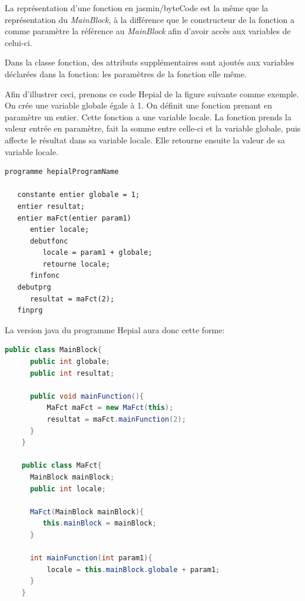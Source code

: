 \documentclass[11pt,a4paper]{article}
\begin{document}
  \par La représentation d'une fonction en jasmin/byteCode est la même que la représentation du \textit{MainBlock}, à la différence que le constructeur de la fonction a comme paramètre la référence au \textit{MainBlock} afin d'avoir accès aux variables de celui-ci. 
  
  \par Dans la classe fonction, des attributs supplémentaires sont ajoutés aux variables déclarées dans la fonction: les paramètres de la fonction elle même. 
  
  \par Afin d'illustrer ceci, prenons ce code Hepial de la figure suivante comme exemple. On crée une variable globale égale à 1. On définit une fonction prenant en paramètre un entier. Cette fonction a une variable locale. La fonction prends la valeur entrée en paramètre, fait la somme entre celle-ci et la variable globale, puis affecte le résultat dans sa variable locale. Elle retourne ensuite la valeur de sa variable locale. 
  \newpage
    \begin{lstlisting}[caption={Architecture d'une fonction et de son appel}]
   programme hepialProgramName

   constante entier globale = 1;
   entier resultat;
   entier maFct(entier param1)
      entier locale;
      debutfonc
         locale = param1 + globale;
         retourne locale;
      finfonc
   debutprg
      resultat = maFct(2);
   finprg
   \end{lstlisting} 
   
   \par La version java du programme Hepial aura donc cette forme: 
   
    \begin{lstlisting}[language=java,caption={Architecture de base d'un programme Hepial}]
    public class MainBlock{
      public int globale;
      public int resultat;
   
      public void mainFunction(){
          MaFct maFct = new MaFct(this);
          resultat = maFct.mainFunction(2);
      }
    }
    
    public class MaFct{
      MainBlock mainBlock;
      public int locale;
      
      MaFct(MainBlock mainBlock){
         this.mainBlock = mainBlock;
      }
      
      int mainFunction(int param1){
          locale = this.mainBlock.globale + param1;
      }
    }
   \end{lstlisting}    
  
\end{document}
